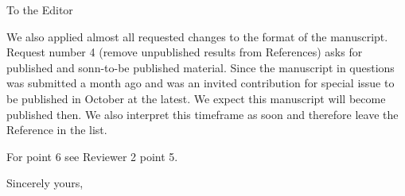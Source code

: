 \documentclass[DIN,pagenumber=false,parskip=half,fromalign=left,fromphone=true,fromemail=true,fromurl=false,fromlogo=false,fromrule=false]{scrlttr2}
\begin{document}
\begin{letter}{To the Editor}
\begin{enumerate}
\end{enumerate}

We also applied almost all requested changes to the format of the manuscript.
Request number 4 (remove unpublished results from References) asks for
published and sonn-to-be published material. Since the manuscript in
questions was submitted a month ago and was an invited contribution
for special issue to be published in October at the latest.
We expect this manuscript
will become published then. We also interpret this timeframe as soon
and therefore leave the Reference in the list.

For point 6 see Reviewer 2 point 5.



        \closing{Sincerely yours,}
	\end{letter}
\end{document}
